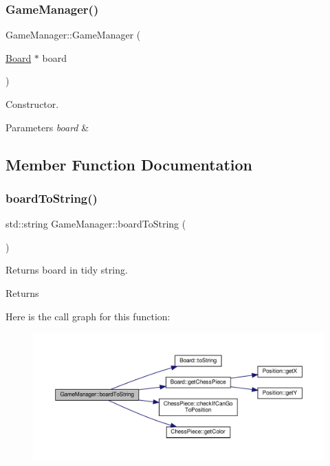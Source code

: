 \subsubsection{\texorpdfstring{Game\+Manager()}{GameManager()}}
{\footnotesize\ttfamily Game\+Manager\+::\+Game\+Manager (\begin{DoxyParamCaption}\item[{\hyperlink{classBoard}{Board} $\ast$}]{board }\end{DoxyParamCaption})}



Constructor. 


\begin{DoxyParams}{Parameters}
{\em board} & \\
\hline
\end{DoxyParams}


\subsection{Member Function Documentation}
\mbox{\label{classGameManager_a882cb4b776ef8d0e6912c175d746fcdd}} 
\subsubsection{\texorpdfstring{board\+To\+String()}{boardToString()}}
{\footnotesize\ttfamily std\+::string Game\+Manager\+::board\+To\+String (\begin{DoxyParamCaption}{ }\end{DoxyParamCaption})}



Returns board in tidy string. 

\begin{DoxyReturn}{Returns}

\end{DoxyReturn}
Here is the call graph for this function\+:
\nopagebreak
\begin{figure}[H]
\begin{center}
\leavevmode
\includegraphics[width=350pt]{classGameManager_a882cb4b776ef8d0e6912c175d746fcdd_cgraph}
\end{center}
\end{figure}
\mbox{\label{classGameManager_a115bc92a76d5a500667601ede0becb07}} 
